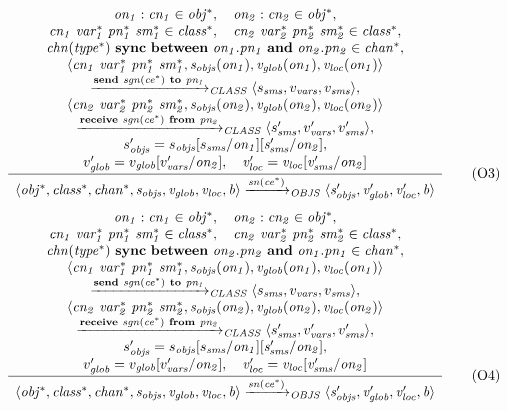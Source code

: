 \begin{equation*}
 \frac{ \begin{array}[c]{c} 
\it{on_1}:\it{cn_1} \in \it{obj^*}, \quad
\it{on_2}:\it{cn_2} \in \it{obj^*}, \\
\it{cn_1}~\it{var^*_1}~\it{pn^*_1}~\it{sm^*_1} \in \it{class^*}, \quad
\it{cn_2}~\it{var^*_2}~\it{pn^*_2}~\it{sm^*_2} \in \it{class^*}, \\
\it{chn}(\it{type^*})~\textbf{sync}~\textbf{between}~\it{on_1}.\it{pn_1}~\textbf{and}~\it{on_2}.\it{pn_2} \in \it{chan^*}, \\
\langle \it{cn_1}~\it{var^*_1}~\it{pn^*_1}~\it{sm^*_1}, s_{\it{objs}}(\it{on_1}), v_{\it{glob}}(\it{on_1}), v_{\it{loc}}(\it{on_1}) \rangle \\
\xrightarrow{\it{\textbf{send}~\it{sgn}(\it{ce^*})~\textbf{to}~\it{pn_1}}}_{\it{CLASS}}
\langle s_{\it{sms}}, v_{\it{vars}}, v_{\it{sms}} \rangle, \\
\langle \it{cn_2}~\it{var^*_2}~\it{pn^*_2}~\it{sm^*_2}, s_{\it{objs}}(\it{on_2}), v_{\it{glob}}(\it{on_2}), v_{\it{loc}}(\it{on_2}) \rangle \\
\xrightarrow{\it{\textbf{receive}~\it{sgn}(\it{ce^*})~\textbf{from}~\it{pn_2}}}_{\it{CLASS}}
\langle s_{\it{sms}}', v_{\it{vars}}', v_{\it{sms}}' \rangle, \\
s_{\it{objs}}' = s_{\it{objs}}[s_{\it{sms}}/\it{on_1}][s_{\it{sms}}'/\it{on_2}], \\
v_{\it{glob}}' = v_{\it{glob}}[v_{\it{vars}}'/\it{on_2}], \quad
v_{\it{loc}}' = v_{\it{loc}}[v_{\it{sms}}'/\it{on_2}]
 \end{array} }{ \begin{array}[c]{c} 
\langle \it{obj^*}, \it{class^*}, \it{chan^*}, s_{\it{objs}}, v_{\it{glob}}, v_{\it{loc}}, b \rangle
\xrightarrow{\it{\it{sn}(\it{ce^*})}}_{\it{OBJS}}
\langle s_{\it{objs}}', v_{\it{glob}}', v_{\it{loc}}', b \rangle
 \end{array} } 
\tag{O3}
\label{eq:sos-slco:object-syncbi1}
\end{equation*}
%
\begin{equation*}
 \frac{ \begin{array}[c]{c} 
\it{on_1}:\it{cn_1} \in \it{obj^*}, \quad
\it{on_2}:\it{cn_2} \in \it{obj^*}, \\
\it{cn_1}~\it{var^*_1}~\it{pn^*_1}~\it{sm^*_1} \in \it{class^*}, \quad
\it{cn_2}~\it{var^*_2}~\it{pn^*_2}~\it{sm^*_2} \in \it{class^*}, \\
\it{chn}(\it{type^*})~\textbf{sync}~\textbf{between}~\it{on_2}.\it{pn_2}~\textbf{and}~\it{on_1}.\it{pn_1} \in \it{chan^*}, \\
\langle \it{cn_1}~\it{var^*_1}~\it{pn^*_1}~\it{sm^*_1}, s_{\it{objs}}(\it{on_1}), v_{\it{glob}}(\it{on_1}), v_{\it{loc}}(\it{on_1}) \rangle \\
\xrightarrow{\it{\textbf{send}~\it{sgn}(\it{ce^*})~\textbf{to}~\it{pn_1}}}_{\it{CLASS}}
\langle s_{\it{sms}}, v_{\it{vars}}, v_{\it{sms}} \rangle, \\
\langle \it{cn_2}~\it{var^*_2}~\it{pn^*_2}~\it{sm^*_2}, s_{\it{objs}}(\it{on_2}), v_{\it{glob}}(\it{on_2}), v_{\it{loc}}(\it{on_2}) \rangle \\
\xrightarrow{\it{\textbf{receive}~\it{sgn}(\it{ce^*})~\textbf{from}~\it{pn_2}}}_{\it{CLASS}}
\langle s_{\it{sms}}', v_{\it{vars}}', v_{\it{sms}}' \rangle, \\
s_{\it{objs}}' = s_{\it{objs}}[s_{\it{sms}}/\it{on_1}][s_{\it{sms}}'/\it{on_2}], \\
v_{\it{glob}}' = v_{\it{glob}}[v_{\it{vars}}'/\it{on_2}], \quad
v_{\it{loc}}' = v_{\it{loc}}[v_{\it{sms}}'/\it{on_2}]
 \end{array} }{ \begin{array}[c]{c} 
\langle \it{obj^*}, \it{class^*}, \it{chan^*}, s_{\it{objs}}, v_{\it{glob}}, v_{\it{loc}}, b \rangle
\xrightarrow{\it{\it{sn}(\it{ce^*})}}_{\it{OBJS}}
\langle s_{\it{objs}}', v_{\it{glob}}', v_{\it{loc}}', b \rangle
 \end{array} } 
\tag{O4}
\label{eq:sos-slco:object-syncbi2}
\end{equation*}

